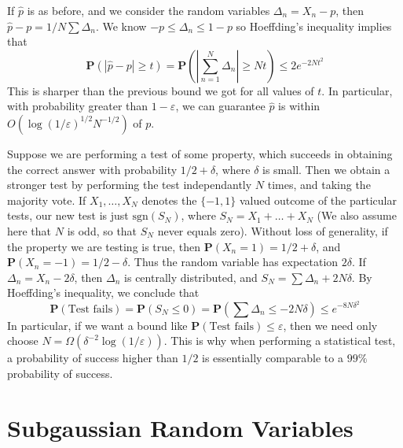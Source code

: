 \begin{example}
    If $\widehat{p}$ is as before, and we consider the random variables $\Delta_n = X_n - p$, then $\widehat{p} - p = 1/N \sum \Delta_n$. We know $-p \leq \Delta_n \leq 1 - p$ so Hoeffding's inequality implies that
    \[ \mathbf{P} (|\widehat{p} - p| \geq t) = \mathbf{P} \left( |\sum_{n = 1}^N \Delta_n| \geq Nt \right) \leq 2 e^{-2N t^2} \]
    This is sharper than the previous bound we got for all values of $t$. In particular, with probability greater than $1 - \varepsilon$, we can guarantee $\widehat{p}$ is within $O(\log(1/\varepsilon)^{1/2} N^{-1/2})$ of $p$.
\end{example}

\begin{example}
    Suppose we are performing a test of some property, which succeeds in obtaining the correct answer with probability $1/2 + \delta$, where $\delta$ is small. Then we obtain a stronger test by performing the test independantly $N$ times, and taking the majority vote. If $X_1,\dots, X_N$ denotes the $\{ -1,1 \}$ valued outcome of the particular tests, our new test is just $\text{sgn}(S_N)$, where $S_N = X_1 + \dots + X_N$ (We also assume here that $N$ is odd, so that $S_N$ never equals zero). Without loss of generality, if the property we are testing is true, then $\mathbf{P}(X_n = 1) = 1/2 + \delta$, and $\mathbf{P}(X_n = -1) = 1/2 - \delta$. Thus the random variable has expectation $2\delta$. If $\Delta_n = X_n - 2\delta$, then $\Delta_n$ is centrally distributed, and $S_N = \sum \Delta_n + 2N \delta$. By Hoeffding's inequality, we conclude that
    \[ \mathbf{P}(\text{Test fails}) = \mathbf{P} \left( S_N \leq 0 \right) = \mathbf{P} \left( \sum \Delta_n \leq -2N\delta \right) \leq e^{-8N \delta^2} \]
    In particular, if we want a bound like $\mathbf{P}(\text{Test fails}) \leq \varepsilon$, then we need only choose $N = \Omega(\delta^{-2} \log(1/\varepsilon))$. This is why when performing a statistical test, a probability of success higher than $1/2$ is essentially comparable to a $99\%$ probability of success.
\end{example}

\section{Subgaussian Random Variables}

